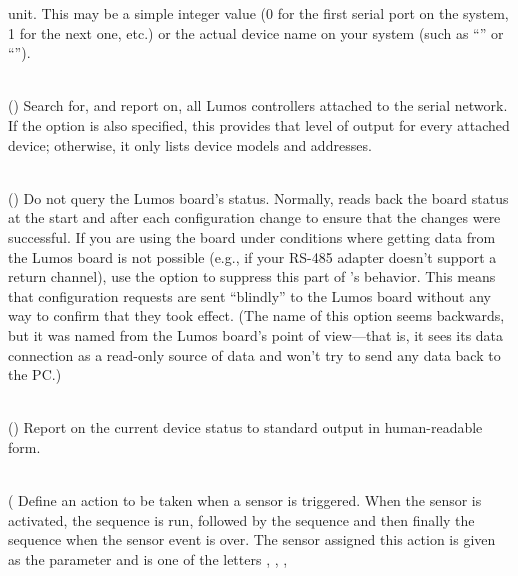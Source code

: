 \begin{list}{}{}
unit.  This may be a simple integer value (0 for the first serial port
on the system, 1 for the next one, etc.) or the actual device name
on your system (such as 
``''
or
``'').
\item[{\codetype{----probe}}]\hfill\\
()
Search for, and report on, all Lumos controllers attached to the serial network.
If the
option is also specified, this provides that level of output for every attached
device; otherwise, it only lists device models and addresses.
\item[{\codetype{----read--only}}]\hfill\\
()
Do not query the Lumos board's status.  Normally, 
reads back the board status at the start and after each configuration change
to ensure that the changes were successful.  If you are using the board under
conditions where getting data from the Lumos board is not possible (e.g., if your
RS-485 adapter doesn't support a return channel), use the
option to suppress this part of
's
behavior.  This means that configuration requests are sent ``blindly'' to
the Lumos board without any way to confirm that they took effect.  (The name
of this option seems backwards, but it was named from the Lumos board's point
of view---that is, it sees its data connection as a read-only source of data
and won't try to send any data back to the PC.)
\item[{\codetype{----report}}]\hfill\\
()
Report on the current device status to standard output in human-readable form.
\item[{\codetype{----sensor=}\Var*{s}\codetype{\textnormal{[}orw+\textnormal{]}:}\Var*{init}\codetype{:}\Var*{seq}\codetype{:}\Var*{term}}]\hfill\\
(
\codetype{:}\codetype{:}\codetype{\textnormal{)}}
Define an action to be taken when a sensor is triggered.  When the sensor
is activated, the sequence
is run, followed by the sequence
and then finally the sequence
when the sensor event is over.  The sensor assigned this action is given
as the parameter
and is one of the letters 
,
,
,

\end{list}
